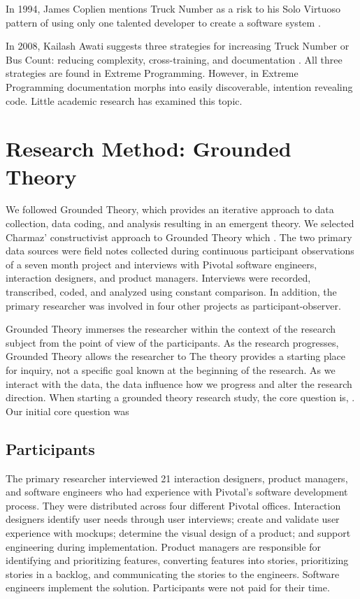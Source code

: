 In 1994, James Coplien mentions Truck Number as a risk to his Solo Virtuoso pattern of using only one talented developer to create a software system \cite{Coplien1994}. 

In 2008, Kailash Awati suggests three strategies for increasing Truck Number or Bus Count: reducing complexity, cross-training, and documentation \cite{AwatiBusFactor}. All three strategies are found in Extreme Programming. However, in Extreme Programming documentation morphs into easily discoverable, intention revealing code. Little academic research has examined this topic. 
\section{Research Method: Grounded Theory}
\label{ResearchMethod}

We followed Grounded Theory, \cite{Charmaz} which provides an iterative approach to data collection, data coding, and analysis resulting in an emergent theory. We selected Charmaz' constructivist approach to Grounded Theory which  \cite{StolGTinSE}. The two primary data sources were field notes collected during continuous participant observations of a seven month project and interviews with Pivotal software engineers, interaction designers, and product managers. Interviews were recorded, transcribed, coded, and analyzed using constant comparison. In addition, the primary researcher was involved in four other projects as participant-observer.

Grounded Theory immerses the researcher within the context of the research subject from the point of view of the participants. As the research progresses, Grounded Theory allows the researcher to  The theory provides a starting place for inquiry, not a specific goal known at the beginning of the research. As we interact with the data, the data influence how we progress and alter the research direction. When starting a grounded theory research study, the core question is,  \cite{GlaserTheoreticalSensitivity}.  Our initial core question was 



\subsection{Participants}
The primary researcher interviewed 21 interaction designers, product managers, and software engineers who had experience with Pivotal's software development process. They were distributed across four different Pivotal offices. Interaction designers identify user needs through user interviews; create and validate user experience with mockups; determine the visual design of a product; and support engineering during implementation. Product managers are responsible for identifying and prioritizing features, converting features into stories, prioritizing stories in a backlog, and communicating the stories to the engineers. Software engineers implement the solution. Participants were not paid for their time. 

